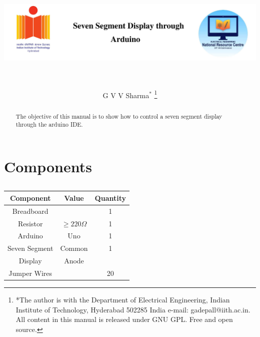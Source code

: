 \documentclass[journal,12pt,twocolumn]{IEEEtran}
\begin{document}
	\title{
		
	
		\includegraphics[width=15cm, height=4cm]{title}
		\centering

		 }
	\author{G V V Sharma$^{*}$%
		\thanks{*The author is with the Department
			of Electrical Engineering, Indian Institute of Technology, Hyderabad
			502285 India e-mail:  gadepall@iith.ac.in. All content in this manual is released under GNU GPL.  Free and open source.}}
	
	\maketitle
	\tableofcontents

	\begin{abstract}
		The objective of this manual is to show how to control
		a seven segment display through the arduino IDE.
	\end{abstract}
	\section{Components}
		\begin{table}[h!]
	\begin{center}
			\begin{tabular}{ |c|c|c| } 
				\hline
				\textbf{Component} & \textbf{Value} & \textbf{Quantity} \\ 
				\hline
				Breadboard &  & 1  \\ 
				\hline
				Resistor & $\ge 220 \Omega$ & 1  \\ 
				\hline
				Arduino & Uno & 1  \\ 
				\hline
				Seven Segment & Common & 1 \\
				Display &  Anode &   \\
				\hline
				Jumper Wires &  & 20  \\
				\hline
			\end{tabular}
			\caption{}
			\label{tab:components}
		\end{center}
	\end{table}
\end{document}
